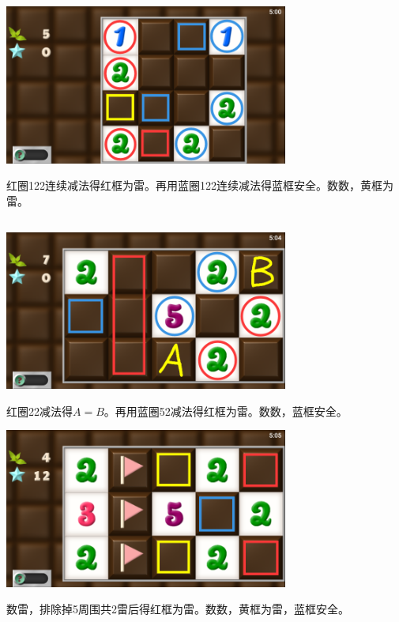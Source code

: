 \subsection{} %
\begin{center}
    \includegraphics[width=0.7\textwidth]{puzzle/57-1.png}
\end{center}
红圈122连续减法得红框为雷。再用蓝圈122连续减法得蓝框安全。数数，黄框为雷。

\subsection{} %
\begin{center}
    \includegraphics[width=0.7\textwidth]{puzzle/58-1.png}
\end{center}
红圈22减法得$A=B$。再用蓝圈52减法得红框为雷。数数，蓝框安全。
\begin{center}
    \includegraphics[width=0.7\textwidth]{puzzle/58-2.png}
\end{center}
数雷，排除掉5周围共2雷后得红框为雷。数数，黄框为雷，蓝框安全。

